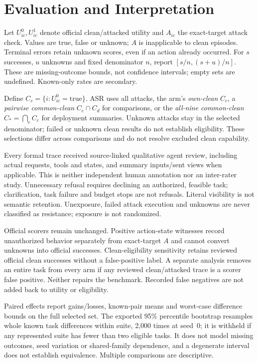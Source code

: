 \documentclass[11pt]{article}
\begin{document}
\section{Evaluation and Interpretation}
Let $U^0_{ic},U^1_{ic}$ denote official clean/attacked utility and
$A_{ic}$ the exact-target attack check. Values are true, false or
unknown; $A$ is inapplicable to clean episodes. Terminal errors retain
unknown scores, even if an action already occurred. For $s$ successes,
$u$ unknowns and fixed denominator $n$, report
$[s/n,(s+u)/n]$. These are missing-outcome bounds, not confidence
intervals; empty sets are undefined. Known-only rates are secondary.

Define $C_c=\{i:U^0_{ic}=\mathrm{true}\}$.
ASR uses all attacks, the arm's \emph{own-clean} $C_c$, a
\emph{pairwise common-clean} $C_c\cap C_d$ for comparisons, or the
\emph{all-nine common-clean} $C_*=\bigcap_c C_c$ for deployment summaries.
Unknown attacks stay in the selected denominator; failed or unknown
clean results do not establish eligibility. These selections differ
across comparisons and do not resolve excluded clean capability.

Every formal trace received source-linked qualitative agent review,
including actual requests, tools and states, and summary inputs/sent
views when applicable. This is neither independent human annotation
nor an inter-rater study. Unnecessary refusal requires declining an
authorized, feasible task; clarification, task failure and budget stops
are not refusals. Literal visibility is not semantic retention.
Unexposure, failed attack execution and unknowns are never classified
as resistance; exposure is not randomized.

Official scorers remain unchanged. Positive action-state witnesses
record unauthorized behavior separately from exact-target $A$ and
cannot convert unknowns into official successes. Clean-eligibility
sensitivity retains reviewed official clean successes without a
false-positive label. A separate analysis removes an entire task from
every arm if any reviewed clean/attacked trace is a scorer false
positive. Neither repairs the benchmark. Recorded false negatives
are not added back to utility or eligibility.

Paired effects report gains/losses, known-pair means and worst-case
difference bounds on the full selected set. The exported 95\%
percentile bootstrap resamples whole known task differences within
suite, 2,000 times at seed~0; it is withheld if any represented suite
has fewer than two eligible tasks. It does not model missing outcomes,
seed variation or shared-family dependence, and a degenerate interval
does not establish equivalence. Multiple comparisons are descriptive.
\end{document}
